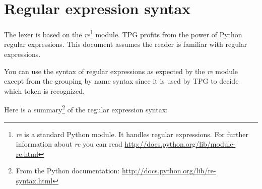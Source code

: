 \section{Regular expression syntax}

The lexer is based on the \emph{re}\footnote{\emph{re} is a standard Python module. It handles regular expressions. For further information about \emph{re} you can read \url{http://docs.python.org/lib/module-re.html}} module.
TPG profits from the power of Python regular expressions.
This document assumes the reader is familiar with regular expressions.

You can use the syntax of regular expressions as expected by the \emph{re} module except from the grouping by name syntax since it is used by TPG to decide which token is recognized.

Here is a summary\footnote{From the Python documentation: \url{http://docs.python.org/lib/re-syntax.html}} of the regular expression syntax:

